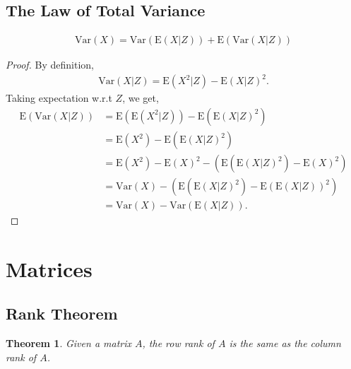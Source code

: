 \documentclass{amsart}
\newtheorem{theorem}{Theorem}
\theoremstyle{plain}
\numberwithin{equation}{section}
\begin{document}
\subsection{The Law of Total Variance}
\begin{align*}
\mathrm{Var}(X) = \mathrm{Var}(\mathrm{E}(X|Z))+
\mathrm{E}(\mathrm{Var}(X|Z)) 
\end{align*}

\begin{proof}
By definition,
\begin{align*}
\mathrm{Var}(X|Z) = \mathrm{E}(X^2|Z) - \mathrm{E}(X|Z)^2.
\end{align*}
Taking expectation w.r.t $Z$, we get,
\begin{align*}
\mathrm{E}(\mathrm{Var}(X|Z)) &= \mathrm{E}(\mathrm{E}(X^2|Z)) - \mathrm{E}(\mathrm{E}(X|Z)^2)\\
&= \mathrm{E}(X^2) - \mathrm{E}(\mathrm{E}(X|Z)^2)\\
&= \mathrm{E}(X^2) - \mathrm{E}(X)^2 - \left(\mathrm{E}(\mathrm{E}(X|Z)^2)-\mathrm{E}(X)^2\right)\\
&= \mathrm{Var}(X) - \left(\mathrm{E}(\mathrm{E}(X|Z)^2)-\mathrm{E}(\mathrm{E}(X|Z))^2\right)\\
&= \mathrm{Var}(X) - \mathrm{Var}(\mathrm{E}(X|Z)).
\end{align*}

\end{proof}
\section{Matrices}
\subsection{Rank Theorem}
\begin{theorem}
Given a matrix $A$, the row rank of $A$ is the 
same as the column rank of $A$. 
\end{theorem}
\end{document}
